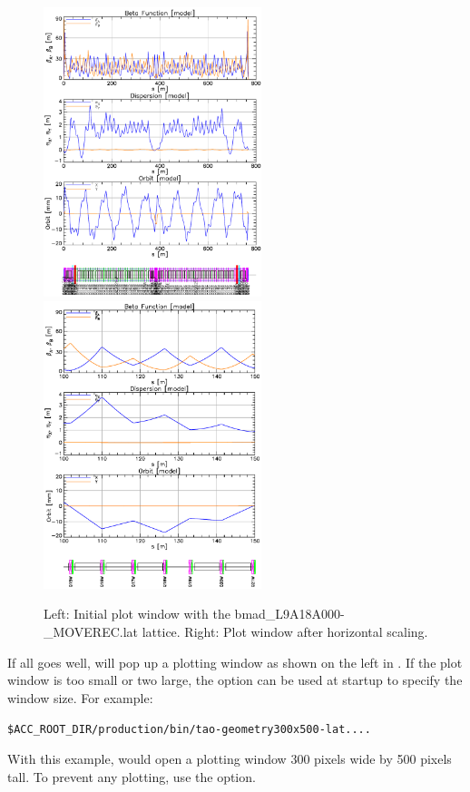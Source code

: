 \documentclass{hitec}
\begin{document}
\begin{figure}[t]
\begin{centering}
\includegraphics[width=2.5in]{tao-start.pdf}
\hfil
\includegraphics[width=2.5in]{tao-x-scale.pdf}
\caption{Left: Initial \tao plot window with the bmad_L9A18A000-_MOVEREC.lat lattice.
Right: Plot window after horizontal scaling.}
\label{f:tao-start}
\end{centering}
\end{figure}

If all goes well, \tao will pop up a plotting window as shown on the left in
. If the plot window is too small or two large, the  option
can be used at startup to specify the window size. For example:
\begin{alltt}
  \$ACC_ROOT_DIR/production/bin/tao -geometry 300x500 -lat ....
\end{alltt}
With this example, \tao would open a plotting window 300 pixels wide by 500 pixels tall.
To prevent any plotting, use the  option.
\end{document}
